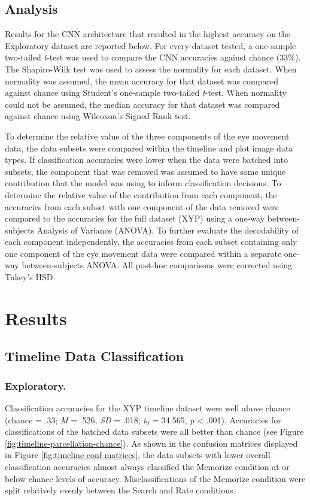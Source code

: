 \documentclass[
  english,
  man, donotrepeattitle,floatsintext]{apa6}
\begin{document}
\subsection{Analysis}

Results for the CNN architecture that resulted in the highest accuracy on the Exploratory dataset are reported below. For every dataset tested, a one-sample two-tailed \emph{t}-test was used to compare the CNN accuracies against chance (33\%). The Shapiro-Wilk test was used to assess the normality for each dataset. When normality was assumed, the mean accuracy for that dataset was compared against chance using Student's one-sample two-tailed \emph{t}-test. When normality could not be assumed, the median accuracy for that dataset was compared against chance using Wilcoxon's Signed Rank test.

To determine the relative value of the three components of the eye movement data, the data subsets were compared within the timeline and plot image data types. If classification accuracies were lower when the data were batched into subsets, the component that was removed was assumed to have some unique contribution that the model was using to inform classification decisions. To determine the relative value of the contribution from each component, the accuracies from each subset with one component of the data removed were compared to the accuracies for the full dataset (XYP) using a one-way between-subjects Analysis of Variance (ANOVA). To further evaluate the decodability of each component independently, the accuracies from each subset containing only one component of the eye movement data were compared within a separate one-way between-subjects ANOVA. All post-hoc comparisons were corrected using Tukey's HSD.

\section{Results}
\subsection{Timeline Data Classification}
\subsubsection{Exploratory.}

Classification accuracies for the XYP timeline dataset were well above chance (chance = .33; \emph{M} = .526, \emph{SD} = .018; \emph{t}\(_{9}\) = 34.565, \emph{p} \textless{} .001). Accuracies for classifications of the batched data subsets were all better than chance (see Figure \ref{fig:timeline-parcellation-chance}). As shown in the confusion matrices displayed in Figure \ref{fig:timeline-conf-matrices}, the data subsets with lower overall classification accuracies almost always classified the Memorize condition at or below chance levels of accuracy. Misclassifications of the Memorize condition were split relatively evenly between the Search and Rate conditions.
\end{document}
